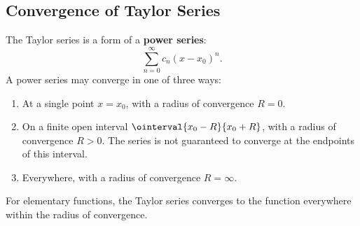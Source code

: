 \documentclass{article}
\begin{document}
\subsection{Convergence of Taylor Series}
The Taylor series is a form of a \textbf{power series}:
\begin{equation*}
    \sum_{n=0}^{\infty} c_n {\left( x - x_0 \right)}^n.
\end{equation*}
A power series may converge in one of three ways:
\begin{enumerate}[label=(\arabic*)]
    \item At a single point \(x = x_0\), with a radius of convergence
    \(R = 0\).
    \item On a finite open interval \(\ointerval{x_0 - R}{x_0 + R}\),
        with a radius of convergence \(R > 0\). The series is not
        guaranteed to converge at the endpoints of this interval.
    \item Everywhere, with a radius of convergence \(R = \infty\).
\end{enumerate}
For elementary functions, the Taylor series converges to the function
everywhere within the radius of convergence.
\end{document}

